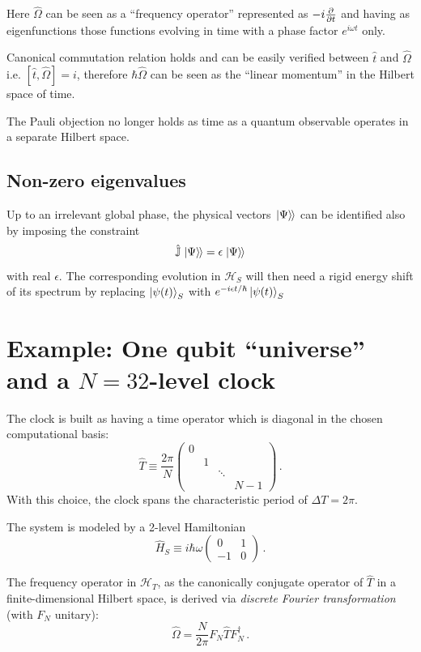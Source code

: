 \documentclass[a0,portrait]{a0poster}
\newcommand{\hilb}[1]{\mathcal{#1}}       %
\DeclareMathOperator*{\repr}{\equiv}      %
\newcommand{\smallback}{\hspace{-0.115em}}
\newcommand{\dket}[1]{\left.\left| #1 \right\rangle\smallback\right\rangle}
\begin{document}
\begin{multicols}{2}
Here $\hat{\Omega}$ can be seen as a ``frequency operator''
represented as $-i\pdv{t}$ and having as eigenfunctions
those functions evolving in time with a phase factor $e^{i \omega t}$ only.

Canonical commutation relation holds and can be easily verified
between $\hat{t}$ and $\hat{\Omega}$
i.e. $[\hat{t}, \hat{\Omega}] = i$,
therefore $\hbar\hat{\Omega}$ can be seen as the ``linear momentum''
in the Hilbert space of time.

The Pauli objection no longer holds as time as a quantum observable operates in a separate Hilbert space.

\subsection*{Non-zero eigenvalues}

Up to an irrelevant global
phase, the physical vectors $\dket{\Psi}$ can be identified also by
imposing the constraint
\[
  \hat{\mathbb{J}}\dket{\Psi} = \epsilon \dket{\Psi}
\]
with real $\epsilon$. The corresponding evolution in $\hilb{H}_S$ will then need
a rigid energy shift of its spectrum by replacing $\ket{\psi(t)}_S$
with $e^{-i \epsilon t / \hbar} \ket{\psi(t)}_S$

\section*{Example: One qubit ``universe'' and a $N=32$-level clock}

The clock is built as having a time operator which is diagonal in the
chosen computational basis:
\[
  \hat{T} \repr \frac{2\pi}{N}
  \begin{pmatrix}
    0           &       &       &       \\
                &1      &       &       \\
                &       &\ddots &       \\
                &       &       &N-1
  \end{pmatrix} \,\text{.}
\]
With this choice, the clock spans the characteristic period of $\Delta T = 2\pi$.

The system is modeled by a 2-level Hamiltonian
\[
  \hat{H}_S \repr
  i \hbar \omega
  \begin{pmatrix}
    0   & 1   \\
    -1  & 0
  \end{pmatrix}
  \, \text{.}
\]

The frequency operator in $\hilb{H}_T$, as the canonically conjugate operator
of $\hat{T}$ in a finite-dimensional Hilbert space, is derived via
\emph{discrete Fourier transformation} \cite{FiniteHilb} (with $F_N$ unitary):
\[
  \hat{\Omega} = \frac{N}{2\pi} F^{}_{N} \hat{T} F^{\dagger}_{N} \, \text{.}
\]


\end{multicols}
\end{document}
